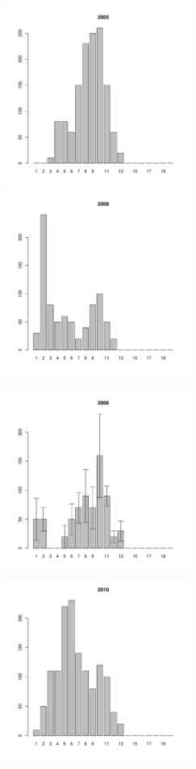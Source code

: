 \begin{figure}[h]
\begin{multicols}{3}
\hfill
\includegraphics[width=60mm]{../White_Sea/Luvenga_Goreliy/midlow_2005_.pdf}
\hfill
\includegraphics[width=60mm]{../White_Sea/Luvenga_Goreliy/midlow_2009_.pdf}
\end{multicols}


\begin{multicols}{3}
\hfill
\includegraphics[width=60mm]{../White_Sea/Luvenga_Goreliy/midlow_2006_.pdf}
\hfill
\includegraphics[width=60mm]{../White_Sea/Luvenga_Goreliy/midlow_2010_.pdf}
\end{multicols}


\end{figure}
